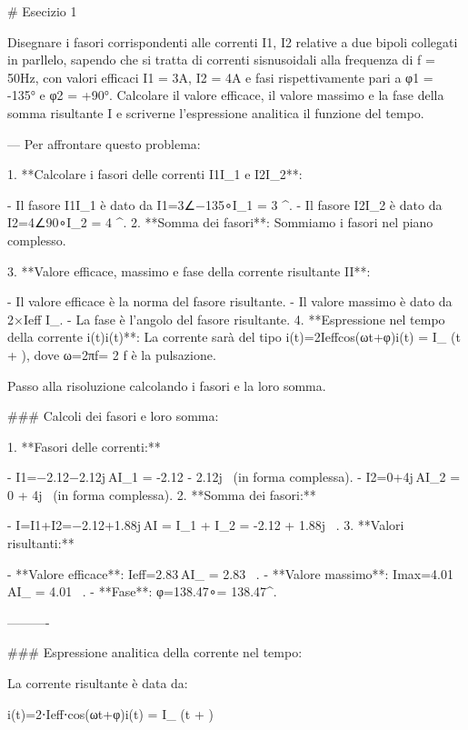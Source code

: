  
# Esecizio 1

Disegnare i fasori corrispondenti alle correnti I1, I2 relative a due bipoli collegati in parllelo, sapendo che si tratta di correnti sisnusoidali alla frequenza di f = 50Hz, con valori efficaci I1 = 3A, I2 = 4A e fasi rispettivamente pari a φ1 = -135° e φ2 = +90°.
Calcolare il valore efficace, il valore massimo e la fase della somma risultante I e scriverne l'espressione analitica il funzione del tempo.

---
Per affrontare questo problema:

1.  **Calcolare i fasori delle correnti I1I_1 e I2I_2**:

    -   Il fasore I1I_1 è dato da I1=3∠−135∘I_1 = 3 ^\circ.
    -   Il fasore I2I_2 è dato da I2=4∠90∘I_2 = 4 ^\circ.
2.  **Somma dei fasori**: Sommiamo i fasori nel piano complesso.

3.  **Valore efficace, massimo e fase della corrente risultante II**:

    -   Il valore efficace è la norma del fasore risultante.
    -   Il valore massimo è dato da 2×Ieff \times I_{}.
    -   La fase è l'angolo del fasore risultante.
4.  **Espressione nel tempo della corrente i(t)i(t)**: La corrente sarà del tipo i(t)=2Ieffcos⁡(ωt+φ)i(t) =  I_{} \cos(\omega t + \varphi), dove ω=2πf\omega = 2 \pi f è la pulsazione.


Passo alla risoluzione calcolando i fasori e la loro somma.

### Calcoli dei fasori e loro somma:

1.  **Fasori delle correnti:**

    -   I1=−2.12−2.12j AI_1 = -2.12 - 2.12j \,  (in forma complessa).
    -   I2=0+4j AI_2 = 0 + 4j \,  (in forma complessa).
2.  **Somma dei fasori:**

    -   I=I1+I2=−2.12+1.88j AI = I_1 + I_2 = -2.12 + 1.88j \, .
3.  **Valori risultanti:**

    -   **Valore efficace**: Ieff=2.83 AI_{} = 2.83 \, .
    -   **Valore massimo**: Imax=4.01 AI_{} = 4.01 \, .
    -   **Fase**: φ=138.47∘\varphi = 138.47^\circ.

----------

### Espressione analitica della corrente nel tempo:

La corrente risultante è data da:

i(t)=2⋅Ieff⋅cos⁡(ωt+φ)i(t) =  \cdot I_{} \cdot \cos(\omega t + \varphi)

